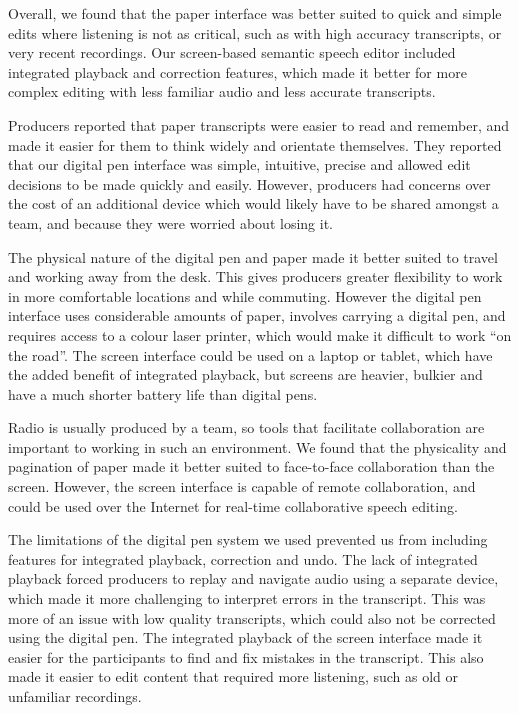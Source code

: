 Overall, we found that the paper interface was better suited to quick and simple edits where listening is not as
critical, such as with high accuracy transcripts, or very recent recordings.  Our screen-based semantic speech editor
included integrated playback and correction features, which made it better for more complex editing with less familiar
audio and less accurate transcripts.

Producers reported that paper transcripts were easier to read and remember, and made it easier for them to think widely
and orientate themselves.  They reported that our digital pen interface was simple, intuitive, precise and allowed edit
decisions to be made quickly and easily.  However, producers had concerns over the cost of an additional device which
would likely have to be shared amongst a team, and because they were worried about losing it.

The physical nature of the digital pen and paper made it better suited to travel and working away from the desk. This
gives producers greater flexibility to work in more comfortable locations and while commuting.  However the digital pen
interface uses considerable amounts of paper, involves carrying a digital pen, and requires access to a colour laser
printer, which would make it difficult to work ``on the road''.  The screen interface could be used on a
laptop or tablet, which have the added benefit of integrated playback, but screens are heavier, bulkier and have a much
shorter battery life than digital pens.

Radio is usually produced by a team, so tools that facilitate collaboration are important to working in such an
environment.  We found that the physicality and pagination of paper made it better suited to face-to-face collaboration
than the screen. However, the screen interface is capable of remote collaboration, and could be used over the Internet
for real-time collaborative speech editing.

The limitations of the digital pen system we used prevented us from including features for integrated playback,
correction and undo. The lack of integrated playback forced producers to replay and navigate audio using a separate
device, which made it more challenging to interpret errors in the transcript. This was more of an issue with low
quality transcripts, which could also not be corrected using the digital pen.  The integrated playback of the screen
interface made it easier for the participants to find and fix mistakes in the transcript.  This also made it
easier to edit content that required more listening, such as old or unfamiliar recordings.

